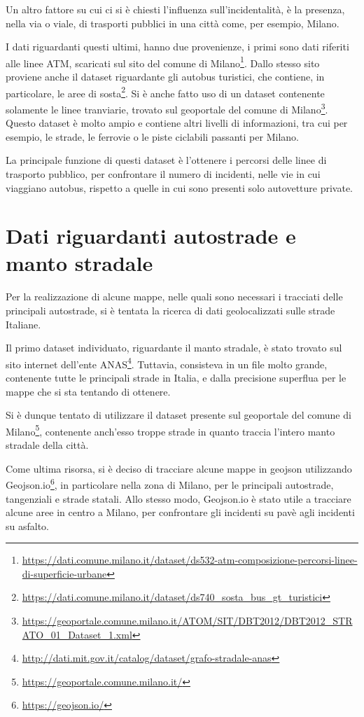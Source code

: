\documentclass[a4paper,12pt]{report}
\begin{document}
Un altro fattore su cui ci si è chiesti l'influenza sull'incidentalità, è la 
presenza, nella via o viale, di trasporti pubblici in una città come, 
per esempio, Milano.

I dati riguardanti questi ultimi, hanno due provenienze, i primi sono 
dati riferiti alle linee ATM, scaricati sul sito del comune di 
Milano\footnote{\url{https://dati.comune.milano.it/dataset/ds532-atm-composizione-percorsi-linee-di-superficie-urbane}}.
Dallo stesso sito proviene anche il dataset riguardante gli autobus turistici, che 
contiene, in particolare, le aree di 
sosta\footnote{\url{https://dati.comune.milano.it/dataset/ds740_sosta_bus_gt_turistici}}.
Si è anche fatto uso di un dataset contenente 
solamente le linee tranviarie, trovato sul geoportale del comune di 
Milano\footnote{\url{https://geoportale.comune.milano.it/ATOM/SIT/DBT2012/DBT2012_STRATO_01_Dataset_1.xml}}.
Questo dataset è molto ampio e contiene altri livelli di informazioni, tra cui per esempio, 
le strade, le ferrovie o le piste ciclabili passanti per Milano. 

La principale funzione di questi dataset è l'ottenere i percorsi delle linee di trasporto pubblico, 
per confrontare il numero di incidenti, nelle vie in cui viaggiano autobus, rispetto a 
quelle in cui sono presenti solo autovetture private.

\section{Dati riguardanti autostrade e manto stradale}

Per la realizzazione di alcune mappe, nelle quali sono necessari i tracciati delle principali 
autostrade, si è tentata la ricerca di dati geolocalizzati sulle strade Italiane.

Il primo dataset individuato, riguardante il manto  stradale, è stato trovato sul sito 
internet dell'ente  
ANAS\footnote{\url{http://dati.mit.gov.it/catalog/dataset/grafo-stradale-anas}}. 
Tuttavia, consisteva in un file molto grande, contenente tutte le principali 
strade in Italia, e dalla precisione superflua per le mappe che si sta tentando di ottenere.

Si è dunque tentato di utilizzare il dataset presente sul geoportale del comune di 
Milano\footnote{\url{https://geoportale.comune.milano.it/}}, 
contenente anch'esso troppe strade in quanto traccia l'intero manto stradale della città.

Come ultima risorsa, si è deciso di tracciare alcune mappe in geojson utilizzando 
Geojson.io\footnote{\url{https://geojson.io/}}, in particolare nella zona di Milano, 
per le principali autostrade, tangenziali e strade statali. 
Allo stesso modo, Geojson.io è stato utile a tracciare alcune aree in centro a Milano, 
per confrontare gli incidenti su pavè agli incidenti su asfalto.
\end{document}
